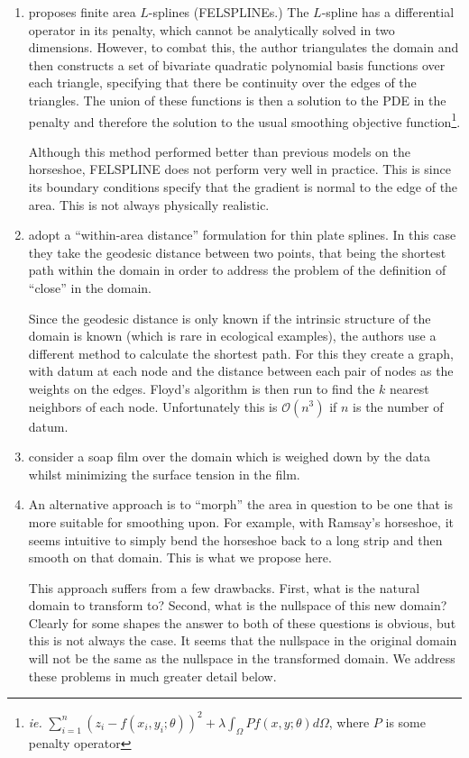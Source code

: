 \documentclass[a4paper,10pt]{amsart}
\begin{document}
\begin{enumerate}
\item \cite{ramsay} proposes finite area $L$-splines (FELSPLINEs.) The $L$-spline has a differential operator in its penalty, which cannot be analytically solved in two dimensions. However, to combat this, the author triangulates the domain and then constructs a set of bivariate quadratic polynomial basis functions over each triangle, specifying that there be continuity over the edges of the triangles. The union of these functions is then a solution to the PDE in the penalty and therefore the solution to the usual smoothing objective function\footnote{\emph{ie.} $\sum_{i=1}^n (z_i-f(x_i,y_i;\theta))^2 + \lambda \int_\Omega Pf(x,y;\theta)d\Omega$, where $P$  is some penalty operator}.

Although this method performed better than previous models on the horseshoe, FELSPLINE does not perform very well in practice. This is since its boundary conditions specify that the gradient is normal to the edge of the area. This is not always physically realistic.

\item \cite{wangranalli} adopt a ``within-area distance'' formulation for thin plate splines. In this case they take the geodesic distance between two points, that being the shortest path within the domain in order to address the problem of the definition of ``close'' in the domain. 

Since the geodesic distance is only known if the intrinsic structure of the domain is known (which is rare in ecological examples), the authors use a different method to calculate the shortest path. For this they create a graph, with datum at each node and the distance between each pair of nodes as the weights on the edges. Floyd's algorithm is then run to find the $k$ nearest neighbors of each node. Unfortunately this is $\mathcal{O}(n^3)$ if $n$ is the number of datum.


\item \cite{soap} consider a soap film over the domain which is weighed down by the data whilst minimizing the surface tension in the film.

\item An alternative approach is to ``morph'' the area in question to be one that is more suitable for smoothing upon. For example, with Ramsay's horseshoe, it seems intuitive to simply bend the horseshoe back to a long strip and then smooth on that domain. This is what we propose here. 

This approach suffers from a few drawbacks. First, what is the natural domain to transform to? Second, what is the nullspace of this new domain? Clearly for some shapes the answer to both of these questions is obvious, but this is not always the case. It seems that the nullspace in the original domain will not be the same as the nullspace in the transformed domain. We address these problems in much greater detail below.


\end{enumerate}
\end{document}
